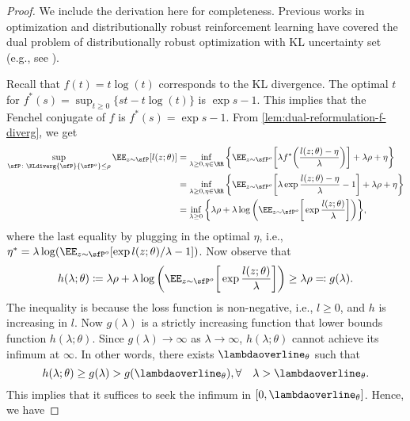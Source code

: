 \begin{proof}
    We include the derivation here for completeness. Previous works in optimization and distributionally robust reinforcement learning have covered the dual problem of distributionally robust optimization with KL uncertainty set (e.g., see \citet{hu2013kullback,panaganti22a,xu-panaganti-2023samplecomplexity}).

    Recall that $f(t)=t\log(t)$ corresponds to the KL divergence. The optimal $t$ for $f^*(s)=\sup_{t\geq 0}\{ st-t\log(t) \}$ is $\exp{s-1}$. This implies that the Fenchel conjugate of $f$ is $f^*(s) = \exp{s-1}$. From \cref{lem:dual-reformulation-f-diverg}, we get
    \begin{align*}
        \sup_{\sfP\colon \KLdiverg{\sfP}{\sfP^o}\leq \rho} \EE_{z\sim\sfP} [l(z;\theta)]&= \inf_{\lambda\geq 0,\eta\in\RR} \bigg\{\EE_{z\sim\sfP^o} \bigg[ \lambda f^*\bigg( \frac{l(z;\theta)-\eta}{\lambda}\bigg)\bigg] + \lambda\rho+\eta \bigg\} \\
        &= \inf_{\lambda\geq 0,\eta\in\RR}\bigg\{\EE_{z\sim\sfP^o}\bigg[ \lambda\exp{\frac{l(z;\theta)-\eta}{\lambda} - 1} \bigg] + \lambda\rho+\eta\bigg\} \\
        &= \inf_{\lambda\geq 0}\bigg\{\lambda\rho + \lambda\log\bigg(\EE_{z\sim\sfP^o}\bigg[ \exp{\frac{l(z;\theta)}{\lambda}}\bigg]\bigg)\bigg\},
    \end{align*}
    where the last equality by plugging in the optimal $\eta$, i.e., $\eta^*=\lambda\log(\EE_{z\sim\sfP^o}[\exp{l(z;\theta)/\lambda - 1}])$. Now observe that
    \begin{equation*}
        h(\lambda;\theta)\coloneqq \lambda\rho + \lambda\log\bigg(\EE_{z\sim\sfP^o}\bigg[ \exp{\frac{l(z;\theta)}{\lambda}}\bigg]\bigg) \geq \lambda\rho \eqqcolon g(\lambda).
    \end{equation*}
    The inequality is because the loss function is non-negative, i.e., $l\geq0$, and $h$ is increasing in $l$. Now $g(\lambda)$ is a strictly increasing function that lower bounds function $h(\lambda;\theta)$. Since $g(\lambda)\to\infty$ as $\lambda\to\infty$, $h(\lambda;\theta)$ cannot achieve its infimum at $\infty$. In other words, there exists $\lambdaoverline_\theta$ such that
    \begin{equation*}
        h(\lambda; \theta) \geq g(\lambda) > g(\lambdaoverline_\theta), \forall \quad \lambda > \lambdaoverline_\theta.
    \end{equation*}
    This implies that it suffices to seek the infimum in $[0,\lambdaoverline_\theta]$. Hence, we have

\end{proof}
